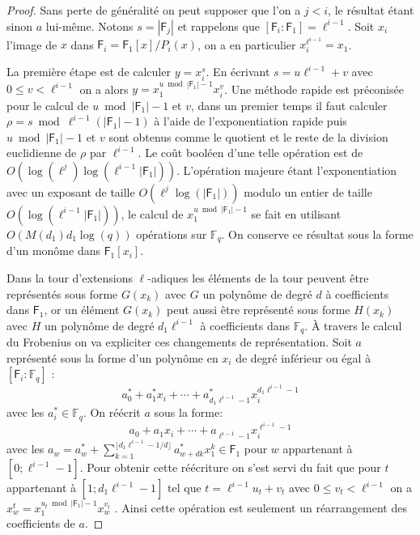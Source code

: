\documentclass[10pt,a4paper]{book}
\theoremstyle{plain}
\theoremstyle{definition}
\theoremstyle{definition}
\theoremstyle{definition}
\theoremstyle{definition}
\theoremstyle{definition}
\theoremstyle{remark}
\theoremstyle{remark}
\theoremstyle{definition}
\begin{document}
\begin{proof}
Sans perte de généralité on peut supposer que l'on a $j<i$, le résultat étant sinon $a$ lui-même. Notons $s= |\mathsf{F}_j|$ et rappelons que $[\mathsf{F}_i:\mathsf{F}_1]=\ell^{i-1}$. Soit $x_i$ l'image de $x$ dans $\mathsf{F}_i=\mathsf{F}_1[x]/P_i(x)$, on a en particulier $x_i^{\ell^{i-1}}=x_1$.

La première étape est de calculer $y=x_i^s$. En écrivant $s=u\ell^{i-1}+v$ avec $0 \leqslant v < \ell^{i-1}$ on a alors $y=x_1^{u \bmod |\mathsf{F}_1|-1}x_i^v$. 
Une méthode rapide est préconisée pour le calcul de $u \bmod |\mathsf{F}_1|-1$ et $v$, dans un premier temps il faut calculer $\rho=s \bmod \ell^{i-1}(|\mathsf{F}_1|-1)$ à l'aide de l'exponentiation rapide puis $u \bmod |\mathsf{F}_1|-1$ et $v$ sont obtenus comme le quotient et le reste de la division euclidienne   de $\rho$ par $\ell^{i-1}$. Le coût booléen d'une telle opération est de $O(\log(\ell^j)\log(\ell^{i-1}|\mathsf{F}_1|))$. L'opération majeure étant l'exponentiation avec un exposant de taille $O(\ell^{j}\log(|\mathsf{F}_1|))$ modulo un entier de taille $O(\log(\ell^{i-1}|\mathsf{F}_1|))$, le calcul de $x_1^{u \bmod |\mathsf{F}_1|-1}$ se fait en utilisant $O( M(d_1) d_1\log(q))$ opérations sur $\mathbb{F}_q$. On conserve ce résultat sous la forme d'un monôme dans $\mathsf{F}_1[x_i]$. 

Dans la tour d'extensions $\ell$-adiques les éléments de la tour peuvent être représentés sous forme $G(x_k)$ avec $G$ un polynôme de degré $d$ à coefficients dans $\mathsf{F}_1$, or un élément $G(x_k)$ peut aussi être représenté sous forme $H(x_k)$ avec $H$ un polynôme de degré $d_1\ell^{i-1}$ à coefficients dans $\mathbb{F}_q$. \`A travers le calcul du Frobenius on va expliciter ces changements de représentation. Soit $a$ représenté sous la forme d'un polynôme en $x_i$ de degré inférieur ou égal à $[\mathsf{F}_i:\mathbb{F}_q]$ : 
\begin{equation*}
a^*_0+a_1^*x_i+ \cdots + a^*_{d_1\ell^{i-1}-1}x_i^{d_1\ell^{i-1}-1}
\end{equation*}
avec les $a_i^* \in \mathbb{F}_q$. On réécrit $a$ sous la forme:
\begin{equation*}
a_0+a_1x_i+ \cdots + a_{\ell^{i-1}-1}x_i^{\ell^{i-1}-1}
\end{equation*}
avec les $a_w=a_w^* + \sum_{k=1}^{\lfloor d_1\ell^{i-1}-1/d \rfloor}a_{w+dk}^*x_1^k \in \mathsf{F}_1$ pour $w$ appartenant à $[0; \ell^{i-1}-1]$. Pour obtenir cette réécriture on s'est servi du fait que pour $t$ appartenant à $[1; d_1\ell^{i-1}-1]$ tel que $t=\ell^{i-1} u_t+v_t$ avec $0 \leqslant v_t<\ell^{i-1}$ on a $x_w^t=x_1^{u_t \bmod |\mathsf{F}_1|-1}x_w^{v_t}$ . Ainsi cette opération est seulement un réarrangement des coefficients de $a$.


\end{proof}
\end{document}
